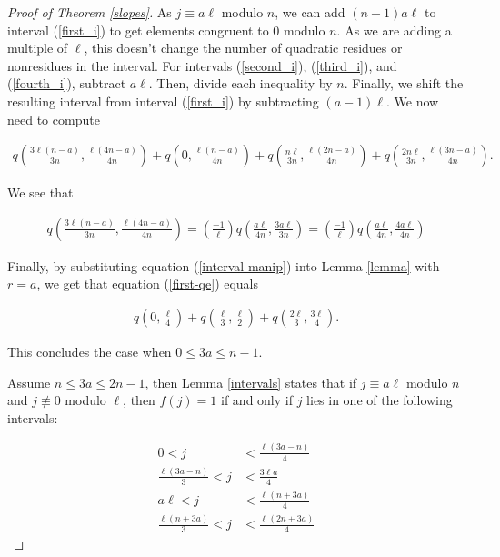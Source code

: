 \documentclass{article}
\theoremstyle{remark}
\theoremstyle{definition}
\begin{document}
\begin{proof}[Proof of Theorem \ref{slopes}]
As $j \equiv a\ell$ modulo $n$, we can add $(n-1)a\ell$ to interval (\ref{first_i}) to get elements congruent to $0$ modulo $n$. As we are adding a multiple of $\ell$, this doesn't change the number of quadratic residues or nonresidues in the interval. For intervals (\ref{second_i}), (\ref{third_i}), and (\ref{fourth_i}), subtract $a\ell$. Then, divide each inequality by $n$. Finally, we shift the resulting interval from interval 
(\ref{first_i}) by subtracting $(a-1)\ell$.  We now need to compute

\begin{align}
    q\left(\frac{3\ell(n-a)}{3n}, \frac{\ell(4n-a)}{4n}\right) + q\left(0, \frac{\ell(n-a)}{4n} \right) + q\left(\frac{n\ell}{3n}, \frac{\ell(2n-a)}{4n} \right) + q\left(\frac{2n\ell}{3n}, \frac{\ell(3n-a)}{4n} \right). \label{first-qe}
\end{align}

We see that

\begin{align}
    q\left(\frac{3\ell(n-a)}{3n}, \frac{\ell(4n-a)}{4n}\right) = \left (\frac{-1}{\ell} \right) q \left(\frac{a\ell}{4n}, \frac{3a\ell}{3n} \right) = \left (\frac{-1}{\ell} \right) q \left(\frac{a\ell}{4n}, \frac{4a\ell}{4n} \right) \label{interval-manip}
\end{align}

Finally, by substituting equation (\ref{interval-manip}) into Lemma \ref{lemma} with $r = a$, we get that equation (\ref{first-qe}) equals

\begin{align*}
    q\left(0, \frac{\ell}{4} \right) + q\left(\frac{\ell}{3}, \frac{\ell}{2} \right) + q\left(\frac{2\ell}{3}, \frac{3\ell}{4} \right).
\end{align*}

This concludes the case when $0 \leq 3a \leq n-1$.

Assume $n \leq 3a \leq 2n-1$, then Lemma \ref{intervals} states that if $j \equiv a\ell$ modulo $n$ and $j \not \equiv 0 $ modulo $\ell$, then $f(j) = 1$ if and only if $j$ lies in one of the following intervals:

\begin{align}
    0 < j& < \frac{\ell(3a-n)}{4} \label{2a-1}\\
    \frac{\ell(3a-n)}{3} < j& < \frac{3\ell a}{4} \label{2a-2}\\
    a\ell < j& < \frac{\ell(n+3a)}{4} \label{2a-3}\\
    \frac{\ell(n+3a)}{3} < j& < \frac{\ell(2n+3a)}{4} \label{2a-4}
\end{align}


\end{proof}
\end{document}
